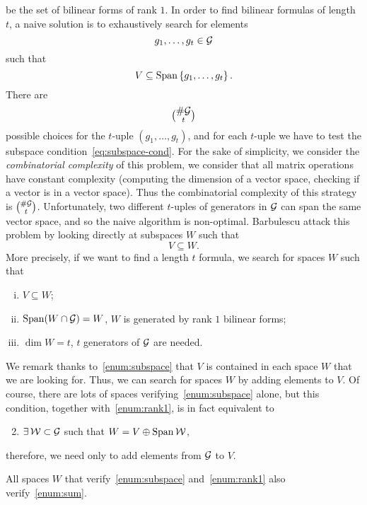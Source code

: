 be the set of bilinear forms of rank $1$. In order to find bilinear formulas of
length $t$, a naive solution is to exhaustively search for elements 
\[
  g_1, \dots, g_t\in\mathcal{G}
\]
such that
\begin{equation}
  V\subseteq\operatorname{Span}\left\{ g_1, \dots, g_t \right\}.
  \label{eq:subspace-cond}
\end{equation}
There are
\[
  {\#\mathcal{G}}\choose{t}
\]
possible choices for the $t$-uple $(g_1, \dots, g_t)$, and for each $t$-uple we
have to test the subspace condition~\eqref{eq:subspace-cond}. For the sake of
simplicity, we consider the \emph{combinatorial complexity} of this problem, \ie
we consider that all matrix operations have constant complexity (\eg computing
the dimension of a vector space, checking if a vector is in a vector space).
Thus the combinatorial complexity of this strategy is ${\#\mathcal{G}}\choose{t}$.
Unfortunately, two different $t$-uples of generators in $\mathcal{G}$ can span the same
vector space, and so the naive algorithm is non-optimal. Barbulescu \etal attack
this problem by looking directly at subspaces $W$ such that
\[
V\subseteq W.
\]
More precisely, if we want to find a length $t$ formula, we search for spaces $W$ such that
\begin{enumerate}[(i)]
  \item \label{enum:subspace} $V\subseteq W$;
  \item \label{enum:rank1} $\operatorname{Span}(W\cap\mathcal{G}) = W$, \ie $W$ is generated by rank $1$ bilinear forms;
  \item $\dim W = t$, \ie $t$ generators of $\mathcal{G}$ are needed.
\end{enumerate}
We remark thanks to~\ref{enum:subspace} that $V$ is contained in each space $W$
that we are looking for. Thus, we can search for spaces $W$ by adding elements
to $V$. Of course, there are lots of spaces verifying~\ref{enum:subspace}
alone, but this condition, together with~\ref{enum:rank1}, is in fact equivalent
to
\begin{enumerate}[(i')]
  \setcounter{enumi}{1}
  \item \label{enum:sum} $\exists\,\mathcal{W}\subset\mathcal{G}$ such that
    $W=V\oplus\operatorname{Span}\mathcal{W}$,
\end{enumerate}
therefore, we need only to add elements from $\mathcal{G}$ to $V$.
\begin{lm}
  \label{lm:cond-equiv}
  All spaces $W$ that verify~\ref{enum:subspace} and~\ref{enum:rank1} also
  verify~\ref{enum:sum}.
\end{lm}
